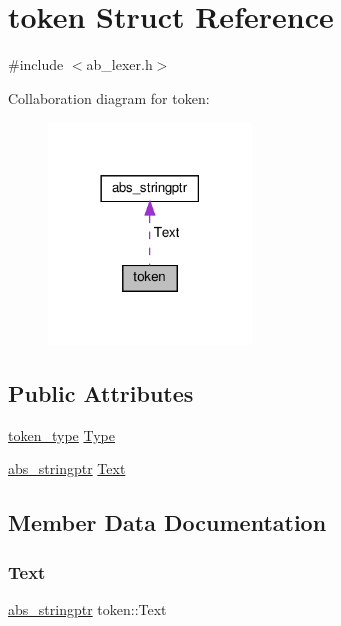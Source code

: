 \hypertarget{structtoken}{}\section{token Struct Reference}
\label{structtoken}


{\ttfamily \#include $<$ab\+\_\+lexer.\+h$>$}



Collaboration diagram for token\+:\nopagebreak
\begin{figure}[H]
\begin{center}
\leavevmode
\includegraphics[width=153pt]{d4/d9c/structtoken__coll__graph}
\end{center}
\end{figure}
\subsection*{Public Attributes}
\begin{DoxyCompactItemize}
\item 
\hyperlink{ab__lexer_8h_afe5ef662303b6b710ea6ee1a944bad0d}{token\+\_\+type} \hyperlink{structtoken_a82914c351900753f626fa2d6fcb12fde}{Type}
\item 
\hyperlink{structabs__stringptr}{abs\+\_\+stringptr} \hyperlink{structtoken_afe96285022144ed40a345ac60d688550}{Text}
\end{DoxyCompactItemize}


\subsection{Member Data Documentation}
\mbox{\label{structtoken_afe96285022144ed40a345ac60d688550}} 
\subsubsection{\texorpdfstring{Text}{Text}}
{\footnotesize\ttfamily \hyperlink{structabs__stringptr}{abs\+\_\+stringptr} token\+::\+Text}

